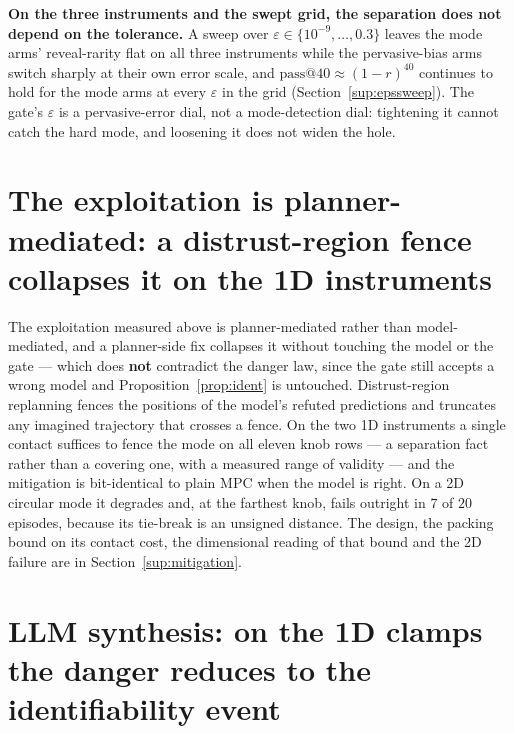 \documentclass[11pt]{article}
\theoremstyle{definition}
\theoremstyle{remark}
\begin{document}
\textbf{On the three instruments and the swept grid, the separation does not depend on the tolerance.} A sweep over $\varepsilon \in \{10^{-9}, \dots, 0.3\}$ leaves the mode arms' reveal-rarity flat on all three instruments while the pervasive-bias arms switch sharply at their own error scale, and $\mathrm{pass@}40 \approx (1-r)^{40}$ continues to hold for the mode arms at every $\varepsilon$ in the grid (Section~\ref{sup:epssweep}). The gate's $\varepsilon$ is a pervasive-error dial, not a mode-detection dial: tightening it cannot catch the hard mode, and loosening it does not widen the hole.

\section{The exploitation is planner-mediated: a distrust-region fence collapses it on the 1D instruments}
\label{sec:mitigation}

The exploitation measured above is planner-mediated rather than model-mediated, and a planner-side fix collapses it without touching the model or the gate --- which does \textbf{not} contradict the danger law, since the gate still accepts a wrong model and Proposition~\ref{prop:ident} is untouched. Distrust-region replanning fences the positions of the model's refuted predictions and truncates any imagined trajectory that crosses a fence. On the two 1D instruments a single contact suffices to fence the mode on all eleven knob rows --- a separation fact rather than a covering one, with a measured range of validity --- and the mitigation is bit-identical to plain MPC when the model is right. On a 2D circular mode it degrades and, at the farthest knob, fails outright in $7$ of $20$ episodes, because its tie-break is an unsigned distance. The design, the packing bound on its contact cost, the dimensional reading of that bound and the 2D failure are in Section~\ref{sup:mitigation}.

\section{LLM synthesis: on the 1D clamps the danger reduces to the identifiability event}
\label{sec:synthesis}
\end{document}
